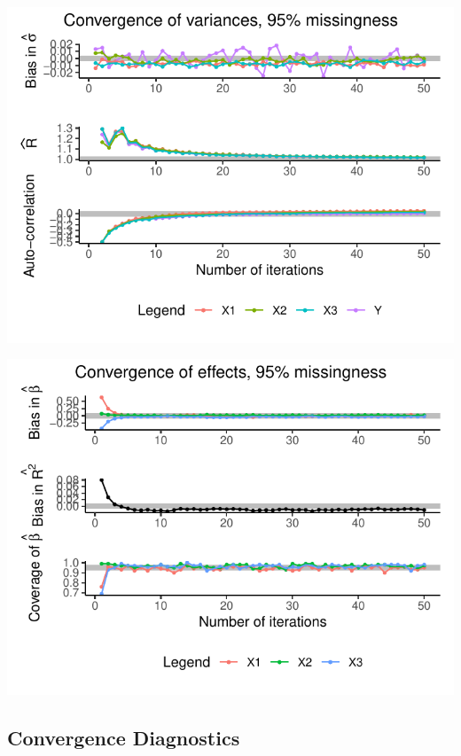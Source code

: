 \documentclass[Royal,times,sageh]{sagej}
\begin{document}
\begin{flushleft}\includegraphics{manuscript_files/figure-latex/unnamed-chunk-16-1} \end{flushleft}

\begin{flushleft}\includegraphics{manuscript_files/figure-latex/unnamed-chunk-17-1} \end{flushleft}

\hypertarget{convergence-diagnostics-1}{%
\subsection{Convergence Diagnostics}\label{convergence-diagnostics-1}}
\end{document}
